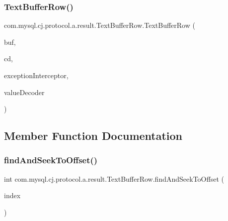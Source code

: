 \subsubsection{\texorpdfstring{Text\+Buffer\+Row()}{TextBufferRow()}}
{\footnotesize\ttfamily com.\+mysql.\+cj.\+protocol.\+a.\+result.\+Text\+Buffer\+Row.\+Text\+Buffer\+Row (\begin{DoxyParamCaption}\item[{\mbox{\hyperlink{classcom_1_1mysql_1_1cj_1_1protocol_1_1a_1_1_native_packet_payload}{Native\+Packet\+Payload}}}]{buf,  }\item[{\mbox{\hyperlink{interfacecom_1_1mysql_1_1cj_1_1protocol_1_1_column_definition}{Column\+Definition}}}]{cd,  }\item[{\mbox{\hyperlink{interfacecom_1_1mysql_1_1cj_1_1exceptions_1_1_exception_interceptor}{Exception\+Interceptor}}}]{exception\+Interceptor,  }\item[{\mbox{\hyperlink{interfacecom_1_1mysql_1_1cj_1_1protocol_1_1_value_decoder}{Value\+Decoder}}}]{value\+Decoder }\end{DoxyParamCaption})}



\subsection{Member Function Documentation}
\mbox{\label{classcom_1_1mysql_1_1cj_1_1protocol_1_1a_1_1result_1_1_text_buffer_row_a3d450230d8439eb5e1462b9f75b2714c}} 
\subsubsection{\texorpdfstring{find\+And\+Seek\+To\+Offset()}{findAndSeekToOffset()}}
{\footnotesize\ttfamily int com.\+mysql.\+cj.\+protocol.\+a.\+result.\+Text\+Buffer\+Row.\+find\+And\+Seek\+To\+Offset (\begin{DoxyParamCaption}\item[{int}]{index }\end{DoxyParamCaption})\hspace{0.3cm}{\ttfamily [protected]}}


